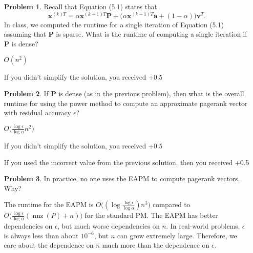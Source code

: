 \documentclass[10pt]{exam}
\theoremstyle{definition}
\newtheorem{problem}{Problem}
\DeclareMathOperator{\nnz}{nnz}
\newcommand{\p}{\mathbf P}
\newcommand{\pr}{\bm \pi}
\newcommand{\x}{\mathbf x}
\newcommand{\ltwo}[1]{{\lVert {#1} \rVert}_2}
\begin{document}
\newpage
\begin{problem}
    Recall that Equation (5.1) states that
\begin{equation*}
    \x^{(k)T}
    =
    \alpha \x^{(k-1)T} \p + \big(\alpha \x^{(k-1)T} \mathbf a + (1-\alpha)\big) \mathbf v^T
    .
    \label{eq:xk}
\end{equation*}
            In class, we computed the runtime for a single iteration of Equation (5.1) assuming that $\p$ is sparse.
What is the runtime of computing a single iteration if $\p$ is dense?
%
    \end{problem}
    \begin{solution}
        $O(n^2)$

        If you didn't simplify the solution, you received +0.5
    \end{solution}

    \newpage
    \begin{problem}
        If $\p$ is dense (as in the previous problem), then what is the overall runtime for using the power method to compute an approximate pagerank vector with residual accuracy $\epsilon$?
\end{problem}
    \begin{solution}
        $O\bigg(\frac{\log\epsilon}{\log\alpha}n^2\bigg)$

        If you didn't simplify the solution, you received +0.5

        If you used the incorrect value from the previous solution, then you received +0.5
    \end{solution}

\newpage
\begin{problem}
    In practice, no one uses the EAPM to compute pagerank vectors.  Why?
\end{problem}
    \begin{solution}
        The runtime for the EAPM is $O\big((\log \frac{\log\epsilon}{\log\alpha})n^3\big)$ compared to $O\big(\frac{\log\epsilon}{\log\alpha}(\nnz(P)+n)\big)$ for the standard PM.
        The EAPM has better dependencies on $\epsilon$, but much worse dependencies on $n$.
        In real-world problems, $\epsilon$ is always less than about $10^{-6}$, but $n$ can grow extremely large.
        Therefore, we care about the dependence on $n$ much more than the dependence on $\epsilon$.
    \end{solution}
\end{document}
